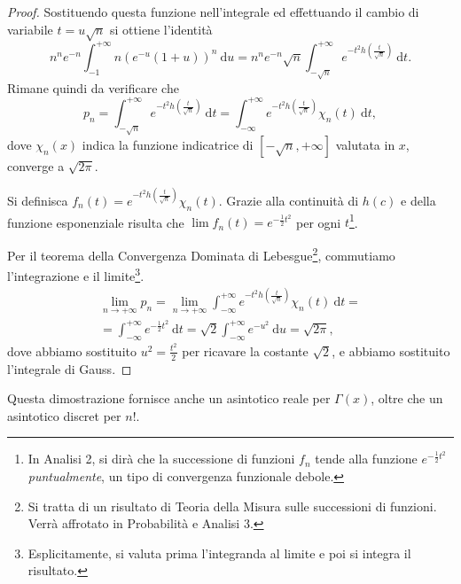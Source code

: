 \begin{proof}
	Sostituendo questa funzione nell'integrale ed effettuando il cambio di variabile $t=u\sqrt{n}$ si ottiene l'identità
	\begin{equation*}
		n^ne^{-n}\int^{+\infty}_{-1}n\left( e^{-u}(1+u)\right)^n \:\mathrm{d}u=
		n^ne^{-n}\sqrt{n}\int^{+\infty}_{-\sqrt{n}} e^{-t^2h\left(\frac{t}{\sqrt{n}}\right)} \:\mathrm{d}t.
	\end{equation*}
	Rimane quindi da verificare che
	\[
		p_n = \int^{+\infty}_{-\sqrt{n}} e^{-t^2h\left(\frac{t}{\sqrt{n}}\right)} \:\mathrm{d}t = \int^{+\infty}_{-\infty} e^{-t^2h\left(\frac{t}{\sqrt{n}}\right)} \chi_n(t) \:\mathrm{d}t,
	\]
	dove $\chi_n(x)$ indica la funzione indicatrice di $\left[-\sqrt{n},+\infty\right]$ valutata in $x$, converge a $\sqrt{2\pi}$.

	Si definisca $f_n(t)= e^{-t^2h\left(\frac{t}{\sqrt{n}}\right)}\chi_n(t)$. Grazie alla continuità di $h(c)$ e della funzione esponenziale risulta che $\lim f_n(t)=e^{-\frac{1}{2}t^2}$ per ogni $t$\footnote{In Analisi 2, si dirà che la successione di funzioni $f_n$ tende alla funzione $e^{-\frac{1}{2}t^2}$ \textit{puntualmente}, un tipo di convergenza funzionale debole.}.

	\goodbreak Per il teorema della Convergenza Dominata di Lebesgue\footnote{Si tratta di un risultato di Teoria della Misura sulle successioni di funzioni. Verrà affrotato in Probabilità e Analisi 3.}, commutiamo l'integrazione e il limite\footnote{Esplicitamente, si valuta prima l'integranda al limite e poi si integra il risultato.}.
	\goodbreak\begin{multline}
		\lim\limits_{n\to+\infty} p_n = \lim\limits_{n\to+\infty}\int^{+\infty}_{-\infty} e^{-t^2h\left(\frac{t}{\sqrt{n}}\right)} \chi_n(t) \:\mathrm{d}t=\\
		=\int^{+\infty}_{-\infty}e^{-\frac{1}{2}t^2}\:\mathrm{d}t=\sqrt{2}\int^{+\infty}_{-\infty}e^{-u^2}\:\mathrm{d}u=\sqrt{2\pi},		
	\end{multline}
	dove abbiamo sostituito $u^2=\frac{t^2}{2}$ per ricavare la costante $\sqrt{2}$, e abbiamo sostituito l'integrale di Gauss.
\end{proof}
Questa dimostrazione fornisce anche un asintotico reale per $\Gamma(x)$, oltre che un asintotico discret per $n!$.
\pagebreak